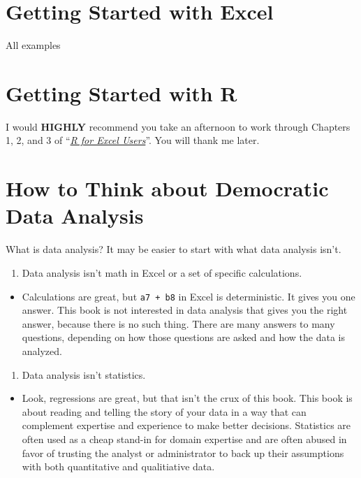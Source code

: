 \documentclass[]{book}
\providecommand{\tightlist}{%
  \setlength{\itemsep}{0pt}\setlength{\parskip}{0pt}}
\begin{document}
\section{Getting Started with Excel}\label{getting-started-with-excel}

All examples

\section{Getting Started with R}\label{getting-started-with-r}

I would \textbf{HIGHLY} recommend you take an afternoon to work through
Chapters 1, 2, and 3 of
``\href{https://rstudio-conf-2020.github.io/r-for-excel/index.html}{\emph{R
for Excel Users}}''. You will thank me later.

\section{How to Think about Democratic Data
Analysis}\label{how-to-think-about-democratic-data-analysis}

What is data analysis? It may be easier to start with what data analysis
isn't.

\begin{enumerate}
\def\labelenumi{\arabic{enumi}.}
\tightlist
\item
  Data analysis isn't math in Excel or a set of specific calculations.
\end{enumerate}

\begin{itemize}
\tightlist
\item
  Calculations are great, but \texttt{a7\ +\ b8} in Excel is
  deterministic. It gives you one answer. This book is not interested in
  data analysis that gives you the right answer, because there is no
  such thing. There are many answers to many questions, depending on how
  those questions are asked and how the data is analyzed.
\end{itemize}

\begin{enumerate}
\def\labelenumi{\arabic{enumi}.}
\setcounter{enumi}{1}
\tightlist
\item
  Data analysis isn't statistics.
\end{enumerate}

\begin{itemize}
\tightlist
\item
  Look, regressions are great, but that isn't the crux of this book.
  This book is about reading and telling the story of your data in a way
  that can complement expertise and experience to make better decisions.
  Statistics are often used as a cheap stand-in for domain expertise and
  are often abused in favor of trusting the analyst or administrator to
  back up their assumptions with both quantitative and qualitiative
  data.
\end{itemize}
\end{document}
